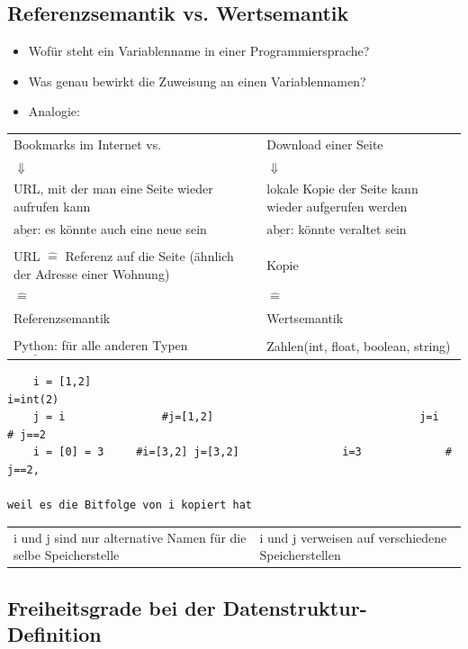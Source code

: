 \documentclass[11pt, fleqn]{scrreprt}
\begin{document}
\subsection*{Referenzsemantik vs. Wertsemantik}
	\begin{itemize}[label={-}]
		\item Wofür steht ein Variablenname in einer Programmiersprache?
		\item Was genau bewirkt die Zuweisung an einen Variablennamen?
		\item Analogie: 
	\end{itemize}
	\begin{tabular}{C{7cm} C{7cm}}
	Bookmarks im Internet \hspace*{1cm}vs. &  Download einer Seite \\
	$\Downarrow$ & $\Downarrow$ \\
	URL, mit der man eine Seite wieder aufrufen kann & lokale Kopie der Seite
	kann wieder aufgerufen werden \\
	$\underline{\text{aber:}}$ es könnte auch eine neue sein & $\underline{\text{aber:}}$ könnte veraltet sein \\
	& \\
	URL $\widehat{=}$ Referenz auf die Seite (ähnlich der Adresse einer Wohnung) & Kopie \\
	$\widehat{=}$ & $\widehat{=}$ \\
	Referenzsemantik & Wertsemantik \\
	 & \\
	$ \underline{\text{Python:}}$ für alle anderen Typen & Zahlen(int, float, boolean, string)\\
	\end{tabular}
	\begin{lstlisting}
	i = [1,2]															i=int(2)
	j = i 				#j=[1,2]								j=i 			# j==2
	i = [0] = 3 	#i=[3,2] j=[3,2]				i=3 			# j==2, 
																						weil es die Bitfolge von i kopiert hat
	\end{lstlisting}
	\begin{tabular}{C{7cm} C{7cm}}
	i und j sind nur alternative Namen für die selbe Speicherstelle & i und j verweisen auf verschiedene Speicherstellen \\
	\end{tabular}
	



\subsection*{Freiheitsgrade bei der Datenstruktur-Definition}
\end{document}
